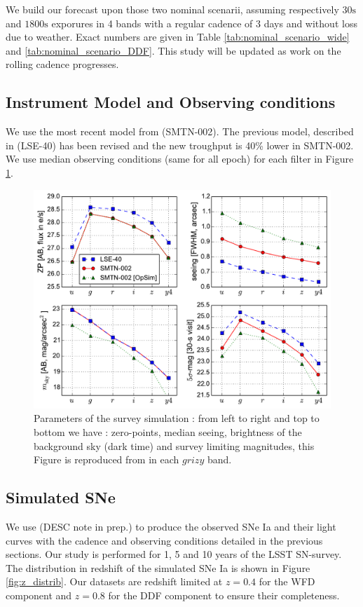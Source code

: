 \documentclass[\docopts]{\docclass}
\begin{document}
We build our forecast upon those two nominal scenarii, assuming respectively $30\mathrm{s}$ and $1800\mathrm{s}$ exporures in 4 bands with a regular cadence of 3 days and without loss due to weather. Exact numbers are given in Table \ref{tab:nominal_scenario_wide}  and \ref{tab:nominal_scenario_DDF}. This study will be updated as work on the rolling cadence progresses.

\subsection{Instrument Model and Observing conditions}

We use the most recent model from \cite{SMTN-002} (SMTN-002). The previous model, described in \cite{LSE-40} (LSE-40) has been revised and the new troughput is 40\% lower  in SMTN-002.
We use median observing conditions (same for all epoch) for each filter in Figure \ref{fig:zp}.

\begin{figure}[t]
\begin{center}
\includegraphics[width=\linewidth]{lsst_model_summary.pdf}
\caption{Parameters of the survey simulation : from left to right and top to bottom we have : zero-points, median seeing, brightness of the background sky (dark time) and survey limiting magnitudes, this Figure is reproduced from \cite{SN-CADENCE} in each $grizy$ band.}
\label{fig:zp}
\end{center}
\end{figure}

\subsection{Simulated SNe}
\label{ssec::snsim}
We use  (DESC note in prep.) to produce the observed SNe Ia and their light curves with the cadence and observing conditions detailed in the previous sections.
Our study is performed for 1, 5 and 10 years of the LSST SN-survey.
The distribution in redshift of the simulated SNe Ia is shown in Figure \ref{fig:z_distrib}.
Our datasets are redshift limited at $z=0.4$ for the WFD component and $z=0.8$ for the DDF component to ensure their completeness.
\end{document}
